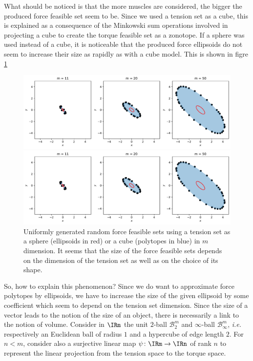 What should be noticed is that the more muscles are considered, the bigger the produced force feasible set seem to be. Since we used a tension set as a cube, this is explained as a consequence of the Minkowski sum operations involved in projecting a cube to create the torque feasible set as a zonotope. If a sphere was used instead of a cube, it is noticeable that the produced force ellipsoids do not seem to increase their size as rapidly as with a cube model. This is shown in figre \ref{fig:ellipsoid_scale}

\begin{figure}[!htb]
    \captionsetup{justification=centering}
    \begin{minipage}{1\linewidth}
        \centering
        \includegraphics[trim={0 261 0 0},clip, width=0.9\linewidth]{img/chapter_3/ellipsoids_size.pdf}
    \end{minipage}
    \begin{minipage}{1\linewidth}
        \centering
        \includegraphics[trim={0 0 0 20},clip, width=0.9\linewidth]{img/chapter_3/ellipsoids_size.pdf}
    \end{minipage}
    
    \caption{Uniformly generated random force feasible sets using a tension set as a sphere (ellipsoids in red) or a cube (polytopes in blue) in $m$ dimension. It seems that the size of the force feasible sets depends on the dimension of the tension set as well as on the choice of its shape.}
    \label{fig:ellipsoid_scale}
\end{figure}

So, how to explain this phenomenon? Since we do want to approximate force polytopes by ellipsoids, we have to increase the size of the given ellipsoid by some coefficient which seem to depend on the tension set dimension. Since the size of a vector leads to the notion of the size of an object, there is necessarily a link to the notion of volume.
Consider in $\IRm$ the unit $2$-ball $\mathcal{B}_2^m$ and $\infty$-ball $\mathcal{B}_{\infty}^m$, \emph{i.e.} respectively an Euclidean ball of radius $1$ and a hypercube of edge length $2$. For $n < m$, consider also a surjective linear map $\psi\colon \IRm\rightarrow \IRn$ of rank $n$ to represent the linear projection from the tension space to the torque space.

